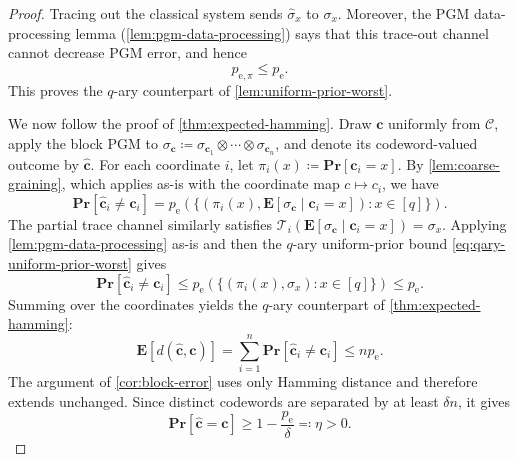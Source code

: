 \documentclass[11pt]{article}
\renewcommand{\leq}{\leqslant}
\renewcommand{\geq}{\geqslant}
\theoremstyle{remark}
\newcommand{\cC}{\mathcal{C}}
\newcommand{\T}{\mathcal{T}}
\newcommand{\Eb}{\mathbf{E}}
\newcommand{\Prb}{\mathbf{Pr}}
\newcommand{\bchat}{\hat{\mathbf{c}}}
\newcommand{\bc}{\mathbf{c}}
\begin{document}
\begin{proof}
Tracing out the classical system sends $\widehat{\sigma}_x$ to $\sigma_x$. Moreover, the PGM data-processing lemma (\cref{lem:pgm-data-processing}) says that this trace-out channel cannot decrease PGM error, and hence
\begin{equation}
\label{eq:qary-uniform-prior-worst}
p_{\mathrm{e},\pi} \leq p_{\mathrm{e}}.
\end{equation}
This proves the $q$-ary counterpart of \cref{lem:uniform-prior-worst}.

We now follow the proof of \cref{thm:expected-hamming}. Draw $\bc$ uniformly from $\cC$, apply the block PGM to $\sigma_{\bc} \coloneqq \sigma_{\bc_1} \otimes \cdots \otimes \sigma_{\bc_n}$, and denote its codeword-valued outcome by $\bchat$. For each coordinate $i$, let $\pi_i(x) \coloneqq \Prb[\bc_i = x]$. By \cref{lem:coarse-graining}, which applies as-is with the coordinate map $c \mapsto c_i$, we have
\begin{equation*}
\Prb[\bchat_i \neq \bc_i]
= p_{\mathrm{e}}\left(\{(\pi_i(x),\Eb[\sigma_{\bc} \mid \bc_i = x]) : x \in [q]\}\right).
\end{equation*}
The partial trace channel similarly satisfies $\T_i(\Eb[\sigma_{\bc} \mid \bc_i = x]) = \sigma_x$. Applying \cref{lem:pgm-data-processing} as-is and then the $q$-ary uniform-prior bound \eqref{eq:qary-uniform-prior-worst} gives
\begin{equation*}
\Prb[\bchat_i \neq \bc_i]
\leq p_{\mathrm{e}}\left(\{(\pi_i(x),\sigma_x) : x \in [q]\}\right)
\leq p_{\mathrm{e}}.
\end{equation*}
Summing over the coordinates yields the $q$-ary counterpart of \cref{thm:expected-hamming}:
\begin{equation*}
\Eb[d(\bchat,\bc)] = \sum_{i = 1}^n{\Prb[\bchat_i \neq \bc_i]} \leq np_{\mathrm{e}}.
\end{equation*}
The argument of \cref{cor:block-error} uses only Hamming distance and therefore extends unchanged. Since distinct codewords are separated by at least $\delta n$, it gives
\begin{equation*}
\Prb[\bchat = \bc] \geq 1-\frac{p_{\mathrm{e}}}{\delta} \eqqcolon \eta > 0.
\end{equation*}


\end{proof}
\end{document}
